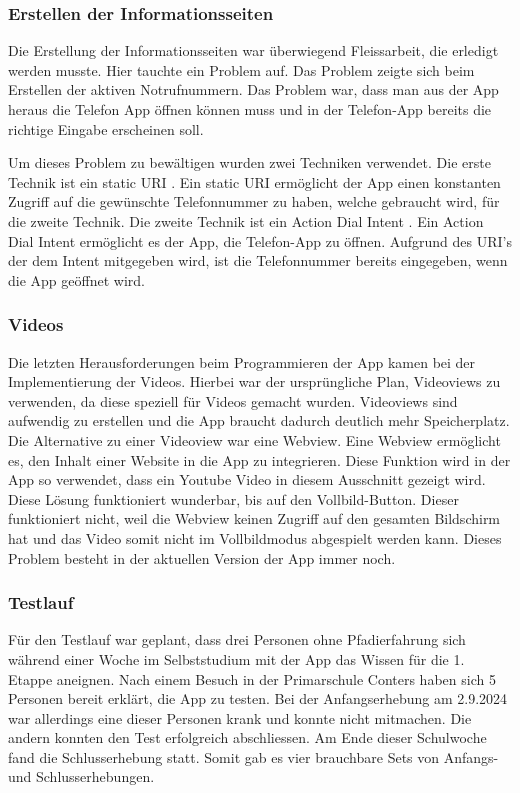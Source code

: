 \subsubsection{Erstellen der Informationsseiten}

Die Erstellung der Informationsseiten war überwiegend Fleissarbeit, die erledigt werden musste. Hier tauchte ein Problem auf. Das Problem zeigte sich beim Erstellen der aktiven Notrufnummern. Das Problem war, dass man aus der App heraus die Telefon App öffnen können muss und in der Telefon-App bereits die richtige Eingabe erscheinen soll.\par
Um dieses Problem zu bewältigen wurden zwei Techniken verwendet. Die erste Technik ist ein static URI \cite{noauthor_uri_nodate}. Ein static URI ermöglicht der App einen konstanten Zugriff auf die gewünschte Telefonnummer zu haben, welche gebraucht wird, für die zweite Technik. Die zweite Technik ist ein Action Dial Intent \cite{noauthor_intent_nodate}. Ein Action Dial Intent ermöglicht es der App, die Telefon-App zu öffnen. Aufgrund des URI's der dem Intent mitgegeben wird, ist die Telefonnummer bereits eingegeben, wenn die App geöffnet wird.

\subsubsection{Videos}

Die letzten Herausforderungen beim Programmieren der App kamen bei der Implementierung der Videos. Hierbei war der ursprüngliche Plan, Videoviews zu verwenden, da diese speziell für Videos gemacht wurden. Videoviews sind aufwendig zu erstellen und die App braucht dadurch deutlich mehr Speicherplatz. Die Alternative zu einer Videoview war eine Webview. Eine Webview ermöglicht es, den Inhalt einer Website in die App zu integrieren. Diese Funktion wird in der App so verwendet, dass ein Youtube Video in diesem Ausschnitt gezeigt wird. Diese Lösung funktioniert wunderbar, bis auf den Vollbild-Button. Dieser funktioniert nicht, weil die Webview keinen Zugriff auf den gesamten Bildschirm hat und das Video somit nicht im Vollbildmodus abgespielt werden kann. Dieses Problem besteht in der aktuellen Version der App immer noch.

\subsubsection{Testlauf}

Für den Testlauf war geplant, dass drei Personen ohne Pfadierfahrung sich während einer Woche im Selbststudium mit der App das Wissen für die 1. Etappe aneignen. Nach einem Besuch in der Primarschule Conters haben sich 5 Personen bereit erklärt, die App zu testen. Bei der Anfangserhebung am 2.9.2024 war allerdings eine dieser Personen krank und konnte nicht mitmachen. Die andern konnten den Test erfolgreich abschliessen. Am Ende dieser Schulwoche fand die Schlusserhebung statt. Somit gab es vier brauchbare Sets von Anfangs- und Schlusserhebungen.


